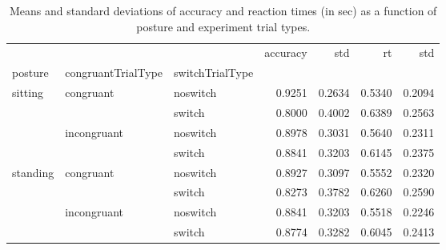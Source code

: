 \begin{table}
\centering
\caption{Means and standard deviations of accuracy and reaction times (in sec) as a function of posture and experiment trial types.}
\label{table-task-switching-replication-reaction-time}
\begin{tabular}{lllrrrr}
\toprule
         &             &        & accuracy &    std &     rt &    std \\
posture & congruantTrialType & switchTrialType &          &        &        &        \\
\midrule
sitting & congruant & noswitch &   0.9251 & 0.2634 & 0.5340 & 0.2094 \\
         &             & switch &   0.8000 & 0.4002 & 0.6389 & 0.2563 \\
         & incongruant & noswitch &   0.8978 & 0.3031 & 0.5640 & 0.2311 \\
         &             & switch &   0.8841 & 0.3203 & 0.6145 & 0.2375 \\
standing & congruant & noswitch &   0.8927 & 0.3097 & 0.5552 & 0.2320 \\
         &             & switch &   0.8273 & 0.3782 & 0.6260 & 0.2590 \\
         & incongruant & noswitch &   0.8841 & 0.3203 & 0.5518 & 0.2246 \\
         &             & switch &   0.8774 & 0.3282 & 0.6045 & 0.2413 \\
\bottomrule
\end{tabular}
\end{table}
